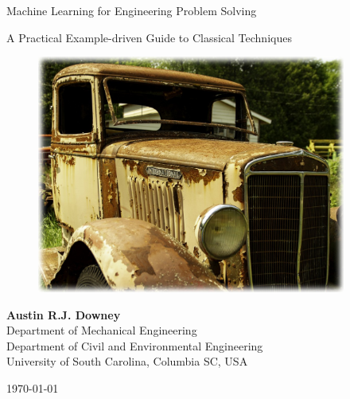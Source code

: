 \documentclass[12pt,letter]{article}
\begin{document}
\thispagestyle{empty}	

\begin{center}
	{\fontsize{33}{100}\selectfont Machine Learning for Engineering Problem Solving}

	\vspace{1cm}

	\begin{center}
	\begin{minipage}{0.75\textwidth}
		\centering
       	{\LARGE{} A Practical Example-driven Guide to Classical Techniques}
	\end{minipage}
	\end{center}

	\vspace{3cm}
	
	\begin{figure}[H]
		\centering
		\includegraphics[width=4.0in]{figures/truck}
		\label{fig:title_figure}
	\end{figure} 
	
	\vspace{2cm}
	
	\textbf{Austin R.J. Downey}\\ Department of Mechanical Engineering \\ Department of Civil and Environmental Engineering \\ University of South Carolina, Columbia SC, USA 
	








	\vspace*{\fill}
	
	\today


\end{center}
\end{document}
